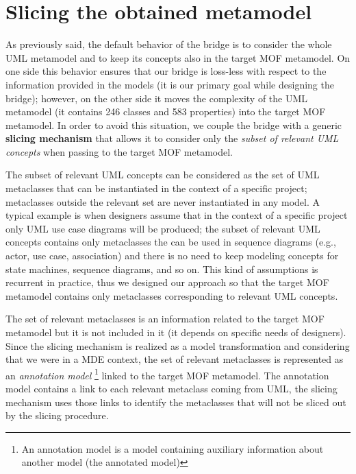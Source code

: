 



\section{Slicing the obtained metamodel}\label{sec:slicing}

As previously said, the default behavior of the bridge is to consider the whole UML metamodel and to keep its concepts also in the
target MOF metamodel. On one side this behavior ensures that our bridge is loss-less with respect to the information
provided in the models (it is our primary goal while designing the bridge);
however, on the other side it moves the complexity of the UML metamodel (it contains 246 classes and 583 properties)
into the target MOF metamodel. 
In order to avoid this situation, we couple the bridge with a generic \textbf{slicing mechanism} that allows it to consider  
only the \textit{subset of relevant UML concepts} when passing to the target MOF metamodel.

The subset of relevant UML concepts can be considered as the set of UML metaclasses that can be instantiated in the context of a specific project;
metaclasses outside the relevant set are never instantiated in any model.
A typical example is when designers assume that in the context of a specific project only UML
use case diagrams will be produced; the subset of relevant UML concepts contains only metaclasses 
the can be used in sequence diagrams (e.g., actor, use case, association) and there is no need to keep modeling concepts
for state machines, sequence diagrams, and so on.
This kind of assumptions is recurrent in practice, thus we designed our approach so that the target MOF metamodel contains only 
metaclasses corresponding to relevant UML concepts.

The set of relevant metaclasses is an information related to the target MOF metamodel but it is not included in it (it depends on specific needs of designers). 
Since the slicing mechanism is realized as a model transformation and considering that we were in a MDE context, the set of relevant
metaclasses is represented as an \textit{annotation model}
\footnote{An annotation model is a model containing auxiliary information about another model (the annotated model)\cite{MCDFthesis}} linked to the target MOF metamodel. The annotation model contains a link to each relevant metaclass coming from UML, the slicing mechanism uses those links to identify the metaclasses that will not be sliced out by the slicing procedure.

